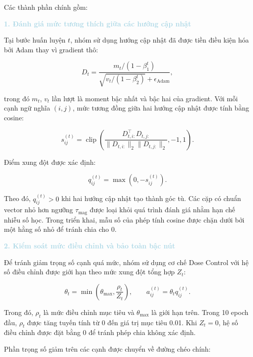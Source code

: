 Các thành phần chính gồm:

\noindent\textcolor{lightblue}{\textbf{1. Đánh giá mức tương thích giữa các hướng cập nhật}}

Tại bước huấn luyện $t$, nhóm sử dụng hướng cập nhật đã được tiền điều kiện hóa bởi Adam thay vì gradient thô:

\begin{equation}
D_t=
\frac{m_t/(1-\beta_1^t)}
{\sqrt{v_t/(1-\beta_2^t)}+\epsilon_{\mathrm{Adam}}},
\end{equation}

trong đó $m_t$, $v_t$ lần lượt là moment bậc nhất và bậc hai của gradient. Với mỗi cạnh ngữ nghĩa $(i,j)$, mức tương đồng giữa hai hướng cập nhật được tính bằng cosine:

\begin{equation}
s_{ij}^{(t)}
=
\operatorname{clip}
\left(
\frac{
D_{t,i:}^{\top}D_{t,j:}
}{
\lVert D_{t,i:}\rVert_2
\lVert D_{t,j:}\rVert_2
},
-1,1
\right).
\end{equation}

Điểm xung đột được xác định:

\begin{equation}
q_{ij}^{(t)}
=
\max\left(0,-s_{ij}^{(t)}\right).
\end{equation}

Theo đó, $q_{ij}^{(t)}>0$ khi hai hướng cập nhật tạo thành góc tù. Các cặp có chuẩn vector nhỏ hơn ngưỡng $\tau_{\mathrm{mag}}$ được loại khỏi quá trình đánh giá nhằm hạn chế nhiễu số học. Trong triển khai, mẫu số của phép tính cosine được chặn dưới bởi một hằng số nhỏ để tránh chia cho 0.

\noindent\textcolor{lightblue}{\textbf{2. Kiểm soát mức điều chỉnh và bảo toàn bậc nút}}

Để tránh giảm trọng số cạnh quá mức, nhóm sử dụng cơ chế Dose Control với hệ số điều chỉnh được giới hạn theo mức xung đột tổng hợp $Z_t$:

\begin{equation}
\theta_t
=
\min\left(
\theta_{\max},
\frac{\rho_t}{Z_t}
\right),
\qquad
a_{ij}^{(t)}
=
\theta_t q_{ij}^{(t)}.
\end{equation}

Trong đó, $\rho_t$ là mức điều chỉnh mục tiêu và $\theta_{\max}$ là giới hạn trên. Trong 10 epoch đầu, $\rho_t$ được tăng tuyến tính từ 0 đến giá trị mục tiêu 0.01. Khi $Z_t=0$, hệ số điều chỉnh được đặt bằng 0 để tránh phép chia không xác định.

Phần trọng số giảm trên các cạnh được chuyển về đường chéo chính:

